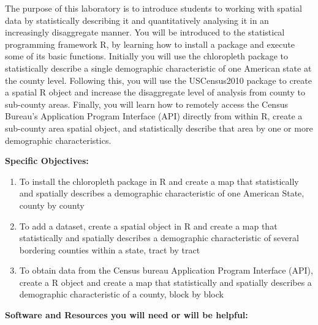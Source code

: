 \documentclass{article}
\begin{document}
\vspace{4mm}

\setlength{\leftskip}{1cm}

\setlength{\parindent}{0cm}

The purpose of this laboratory is to introduce students to working with spatial data by statistically describing it and quantitatively analysing it in an increasingly disaggregate manner.  You will be introduced to the statistical programming framework R, by learning how to install a package and execute some of its basic functions.  Initially you will use the chloropleth package to statistically describe a single demographic characteristic of one American state at the county level.  Following this, you will use the USCensus2010 package to create a spatial R object and increase the disaggregate level of analysis from county to sub-county areas.  Finally, you will learn how to remotely access the Census Bureau's Application Program Interface (API) directly from within R, create a sub-county area spatial object, and statistically describe that area by one or more demographic characteristics.

\vspace{4mm}

\setlength{\leftskip}{0cm}

\large{\textbf{Specific Objectives:}}

\begin{enumerate}[leftmargin=15mm]

\item To install the chloropleth package in R and create a map that statistically and spatially describes a demographic characteristic of one American State, county by county

\item To add a dataset, create a spatial object in R and create a map that statistically and spatially describes a demographic characteristic of several bordering counties within a state, tract by tract

\item To obtain data from the Census bureau Application Program Interface (API), create a R object and create a map that statistically and spatially describes a demographic characteristic of a county, block by block

\end{enumerate}


\large{\textbf{Software and Resources you will need or will be helpful:}}
\end{document}
